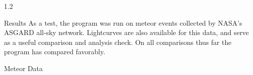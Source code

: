 \documentclass[final]{beamer}
\newlength{\twocolwid}
\begin{document}
\begin{frame}[t]
\begin{columns}[t]
\begin{column}{1.2\twocolwid}









\begin{block}{Results}
As a test, the program was run on meteor events collected by NASA's ASGARD all-sky network. Lightcurves are also available for this data, and serve as a useful comparison and analysis check. On all comparisons thus far the program has compared favorably. 
\end{block}

\begin{alertblock}{Meteor Data}


\end{alertblock}
\end{column}
\end{columns}
\end{frame}
\end{document}
